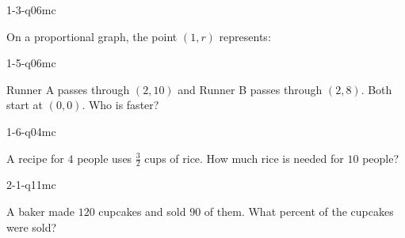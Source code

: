 
\begin{practiceQuestion}{1-3-q06}{mc}
\begin{questionText}
On a proportional graph, the point $(1, r)$ represents:
\end{questionText}
\end{practiceQuestion}

\begin{practiceQuestion}{1-5-q06}{mc}
\begin{questionText}
Runner A passes through $(2, 10)$ and Runner B passes through $(2, 8)$. Both start at $(0, 0)$. Who is faster?
\end{questionText}
\end{practiceQuestion}

\begin{practiceQuestion}{1-6-q04}{mc}
\begin{questionText}
A recipe for $4$ people uses $\frac{3}{2}$ cups of rice. How much rice is needed for $10$ people?
\end{questionText}
\end{practiceQuestion}

\begin{practiceQuestion}{2-1-q11}{mc}
\begin{questionText}
A baker made $120$ cupcakes and sold $90$ of them. What percent of the cupcakes were sold?
\end{questionText}
\end{practiceQuestion}

